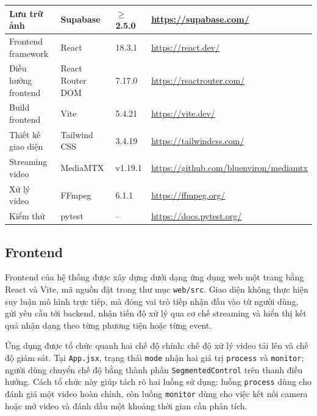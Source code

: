 \documentclass[../DoAn.tex]{subfiles}
\begin{document}
\begin{longtable}{p{3.2cm} p{4.2cm} p{2.6cm} p{4.8cm}}
Lưu trữ ảnh & Supabase & $\geq$ 2.5.0 & \url{https://supabase.com/} \\ \hline
Frontend framework & React & 18.3.1 & \url{https://react.dev/} \\ \hline
Điều hướng frontend & React Router DOM & 7.17.0 & \url{https://reactrouter.com/} \\ \hline
Build frontend & Vite & 5.4.21 & \url{https://vite.dev/} \\ \hline
Thiết kế giao diện & Tailwind CSS & 3.4.19 & \url{https://tailwindcss.com/} \\ \hline
Streaming video & MediaMTX & v1.19.1 & \url{https://github.com/bluenviron/mediamtx} \\ \hline
Xử lý video & FFmpeg & 6.1.1 & \url{https://ffmpeg.org/} \\ \hline
Kiểm thử & pytest & -- & \url{https://docs.pytest.org/} \\ \hline

\end{longtable}

\subsection{Frontend}

Frontend của hệ thống được xây dựng dưới dạng ứng dụng web một trang bằng React và Vite, mã nguồn đặt trong thư mục \texttt{web/src}. Giao diện không thực hiện suy luận mô hình trực tiếp, mà đóng vai trò tiếp nhận đầu vào từ người dùng, gửi yêu cầu tới backend, nhận tiến độ xử lý qua cơ chế streaming và hiển thị kết quả nhận dạng theo từng phương tiện hoặc từng event.

Ứng dụng được tổ chức quanh hai chế độ chính: chế độ xử lý video tải lên và chế độ giám sát. Tại \texttt{App.jsx}, trạng thái \texttt{mode} nhận hai giá trị \texttt{process} và \texttt{monitor}; người dùng chuyển chế độ bằng thành phần \texttt{SegmentedControl} trên thanh điều hướng. Cách tổ chức này giúp tách rõ hai luồng sử dụng: luồng \texttt{process} dùng cho đánh giá một video hoàn chỉnh, còn luồng \texttt{monitor} dùng cho việc kết nối camera hoặc mở video và đánh dấu một khoảng thời gian cần phân tích.
\end{document}
